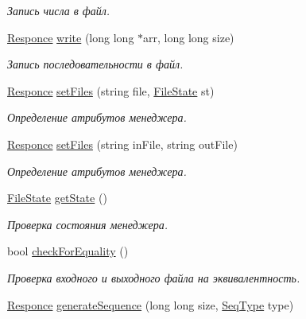 \begin{DoxyCompactItemize}
\begin{DoxyCompactList}\small\item\em Запись числа в файл. \end{DoxyCompactList}\item 
\hyperlink{_structures_8h_a9864d6ef28dd6e38416afac4426b3491}{Responce} \hyperlink{class_file_manager_ad4c96727180b0055942d20b7b5bfe5f8}{write} (long long $\ast$arr, long long size)
\begin{DoxyCompactList}\small\item\em Запись последовательности в файл. \end{DoxyCompactList}\item 
\hyperlink{_structures_8h_a9864d6ef28dd6e38416afac4426b3491}{Responce} \hyperlink{class_file_manager_ab364b91193c482fc7387aec162f677ad}{set\+Files} (string file, \hyperlink{_structures_8h_a57306ae0f9e356347388234ed69e0ce7}{File\+State} st)
\begin{DoxyCompactList}\small\item\em Определение атрибутов менеджера. \end{DoxyCompactList}\item 
\hyperlink{_structures_8h_a9864d6ef28dd6e38416afac4426b3491}{Responce} \hyperlink{class_file_manager_a975bf0088fa67c83d78ec54b9f61a473}{set\+Files} (string in\+File, string out\+File)
\begin{DoxyCompactList}\small\item\em Определение атрибутов менеджера. \end{DoxyCompactList}\item 
\hyperlink{_structures_8h_a57306ae0f9e356347388234ed69e0ce7}{File\+State} \hyperlink{class_file_manager_abd4cbc2b218ab1828ae376a4a9137057}{get\+State} ()
\begin{DoxyCompactList}\small\item\em Проверка состояния менеджера. \end{DoxyCompactList}\item 
bool \hyperlink{class_file_manager_ab490a5a5882d33781dcb6d1d42945d97}{check\+For\+Equality} ()
\begin{DoxyCompactList}\small\item\em Проверка входного и выходного файла на эквивалентность. \end{DoxyCompactList}\item 
\hyperlink{_structures_8h_a9864d6ef28dd6e38416afac4426b3491}{Responce} \hyperlink{class_file_manager_a654c8bf606626cd419f5828839cb21a1}{generate\+Sequence} (long long size, \hyperlink{_structures_8h_a76639e910448c3333d0f4d204e53c2c1}{Seq\+Type} type)

\end{DoxyCompactItemize}
